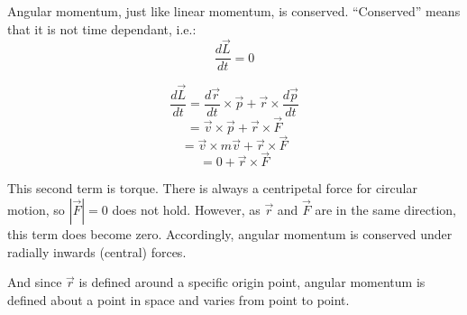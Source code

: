 Angular momentum, just like linear momentum, is conserved. ``Conserved'' means that it is not time dependant, i.e.:
\[
    \frac{d \vec{L}}{dt} = 0
\]

\[
    \frac{d \vec{L}}{dt} = \frac{d \vec{r}}{dt} \times \vec{p} + \vec{r} \times \frac{d \vec{p}}{dt}
\]
\[
    = \vec{v} \times \vec{p} + \vec{r} \times \vec{F}
\]
\[
    = \vec{v} \times m\vec{v} + \vec{r} \times \vec{F}
\]
\[
    = 0 + \vec{r} \times \vec{F}
\]

This second term is torque. There is always a centripetal force for circular motion, so $| \vec{F} |  = 0$ does not hold. However, as $\vec{r}$ and $\vec{F}$ are in the same direction, this term does become zero. Accordingly, angular momentum is conserved under radially inwards (central) forces.

And since $\vec{r}$ is defined around a specific origin point, angular momentum is defined about a point in space and varies from point to point.


